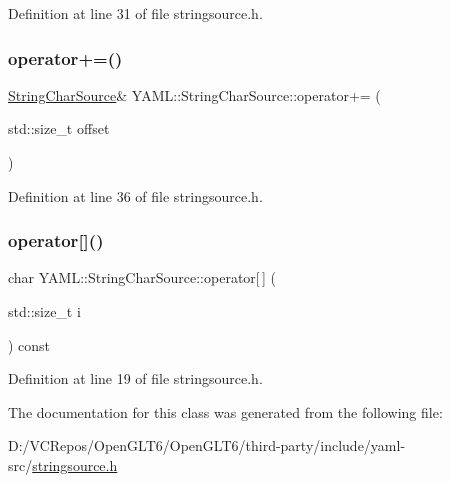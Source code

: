 Definition at line 31 of file stringsource.\+h.

\mbox{\label{class_y_a_m_l_1_1_string_char_source_a32db8dce449a7b95d27a338036c9ad5a}} 
\subsubsection{\texorpdfstring{operator+=()}{operator+=()}}
{\footnotesize\ttfamily \mbox{\hyperlink{class_y_a_m_l_1_1_string_char_source}{String\+Char\+Source}}\& Y\+A\+M\+L\+::\+String\+Char\+Source\+::operator+= (\begin{DoxyParamCaption}\item[{std\+::size\+\_\+t}]{offset }\end{DoxyParamCaption})\hspace{0.3cm}{\ttfamily [inline]}}



Definition at line 36 of file stringsource.\+h.

\mbox{\label{class_y_a_m_l_1_1_string_char_source_a6d01c00ab4757c64a7bc71f6183e3523}} 
\subsubsection{\texorpdfstring{operator[]()}{operator[]()}}
{\footnotesize\ttfamily char Y\+A\+M\+L\+::\+String\+Char\+Source\+::operator\mbox{[}$\,$\mbox{]} (\begin{DoxyParamCaption}\item[{std\+::size\+\_\+t}]{i }\end{DoxyParamCaption}) const\hspace{0.3cm}{\ttfamily [inline]}}



Definition at line 19 of file stringsource.\+h.



The documentation for this class was generated from the following file\+:\begin{DoxyCompactItemize}
\item 
D\+:/\+V\+C\+Repos/\+Open\+G\+L\+T6/\+Open\+G\+L\+T6/third-\/party/include/yaml-\/src/\mbox{\hyperlink{stringsource_8h}{stringsource.\+h}}\end{DoxyCompactItemize}
